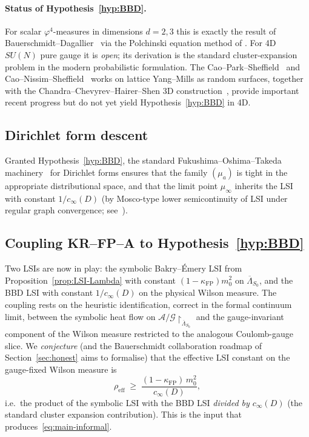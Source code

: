 \documentclass[11pt,a4paper]{amsart}
\theoremstyle{definition}
\newcommand{\kFP}{\kappa_{\mathrm{FP}}}
\newcommand{\cinf}{c_{\infty}}
\begin{document}
\paragraph{Status of Hypothesis~\ref{hyp:BBD}.} For scalar
$\varphi^4$-measures in dimensions $d = 2, 3$ this is exactly the result
of Bauerschmidt--Dagallier~\cite{BauerschmidtDagallier2024} via the Polchinski
equation method of \cite{BauerschmidtBodineauDagallier2024}. For 4D
$SU(N)$ pure gauge it is \emph{open}; its derivation is the standard
cluster-expansion problem in the modern probabilistic formulation. The
Cao--Park--Sheffield~\cite{CaoParkSheffield2024} and
Cao--Nissim--Sheffield~\cite{CaoNissimSheffield2025} works on lattice
Yang--Mills as random surfaces, together with the Chandra--Chevyrev--Hairer--Shen
3D construction~\cite{ChandraChevyrevHairerShen2024}, provide important
recent progress but do not yet yield Hypothesis~\ref{hyp:BBD}
in 4D.

\subsection{Dirichlet form descent}
Granted Hypothesis~\ref{hyp:BBD}, the standard Fukushima--Oshima--Takeda
machinery~\cite{FukushimaOshimaTakeda1994} for Dirichlet forms ensures that
the family $(\mu_a)$ is tight in the appropriate distributional space, and
that the limit point $\mu_\infty$ inherits the LSI with constant
$1/\cinf(D)$ (by Mosco-type lower semicontinuity of LSI under regular
graph convergence; see~\cite[Ch.~4]{BakryGentilLedoux2014}).

\subsection{Coupling KR--FP--A to Hypothesis~\ref{hyp:BBD}}
Two LSIs are now in play: the symbolic Bakry--\'Emery LSI from
Proposition~\ref{prop:LSI-Lambda} with constant $(1-\kFP)m_0^2$ on
$\overline\Lambda_{S_0}$, and the BBD LSI with constant $1/\cinf(D)$ on
the physical Wilson measure. The coupling rests on the heuristic identification,
correct in the formal continuum limit, between the symbolic heat flow on
$\mathcal A/\mathcal G\restriction_{\overline\Lambda_{S_0}}$ and the
gauge-invariant component of the Wilson measure restricted to the analogous
Coulomb-gauge slice. We \emph{conjecture} (and the Bauerschmidt collaboration
roadmap of Section~\ref{sec:honest} aims to formalise) that the effective
LSI constant on the gauge-fixed Wilson measure is
$$
\rho_\mathrm{eff} \;\geq\; \frac{(1-\kFP)\,m_0^2}{\cinf(D)},
$$
i.e.\ the product of the symbolic LSI with the BBD LSI \emph{divided by
$\cinf(D)$} (the standard cluster expansion contribution). This is the
input that produces~\eqref{eq:main-informal}.
\end{document}
